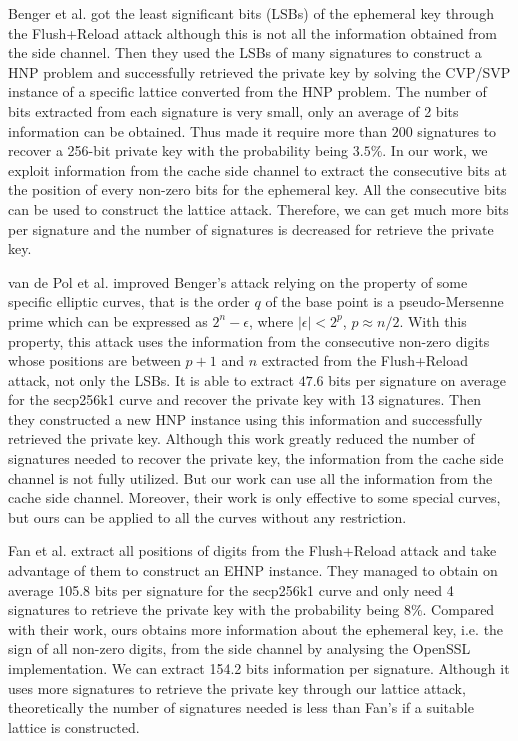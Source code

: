 Benger et al. \cite{Benger2014} got the least significant bits (LSBs) of the ephemeral key through the Flush+Reload attack
although this is not all the information obtained from the side channel.
Then they used the LSBs of many signatures to construct a HNP problem and
successfully retrieved the private key by solving the CVP/SVP instance of a specific lattice converted from the HNP problem.
The number of bits extracted from each signature is very small, only an average of 2 bits information can be obtained.
Thus made it require more than $200$ signatures to recover a 256-bit private key with the probability being $3.5\%$.
In our work, we exploit information from the cache side channel to extract the consecutive bits at the position of every non-zero bits for the ephemeral key.
All the consecutive bits can be used to construct the lattice attack.
Therefore, we can get much more bits per signature and the number of signatures is decreased for retrieve the private key.

van de Pol et al. \cite{Van2015} improved Benger's attack  relying on the property of some specific elliptic curves, that is the order $q$ of the base point is a pseudo-Mersenne prime which can be expressed as $2^n - \epsilon$, where $|\epsilon| < 2^p $, $p \approx n/2$.
With this property, this attack uses the information from the consecutive non-zero digits whose positions are between $p+1$ and $n$ extracted from the Flush+Reload attack, not only the LSBs.
It is able to extract $47.6$ bits per signature on average for the secp256k1 curve and recover the private key with 13 signatures.
Then they constructed a new HNP instance using this information and
successfully retrieved the private key.
Although this work greatly reduced the number of signatures needed to recover the private key,
the information from the cache side channel is not fully utilized.
But our work can use all the information from the cache side channel.
Moreover, their work is only effective to some special curves,
 but ours can be applied to all the curves without any restriction.


Fan et al.\cite{Fan2016} extract all positions of digits from the Flush+Reload attack and take advantage of them to construct an EHNP instance.
They managed to obtain on average 105.8 bits per signature for the secp256k1 curve
 and only need 4 signatures to retrieve the private key with the probability being $8\%$.
 Compared with their work, ours obtains more information about the ephemeral key, i.e. the sign of all non-zero digits, from the side channel by analysing the OpenSSL implementation.
We can extract 154.2 bits information per signature.
Although it uses more signatures to retrieve the private key through our lattice attack,
theoretically the number of signatures needed is less than Fan's if a suitable lattice is constructed.

